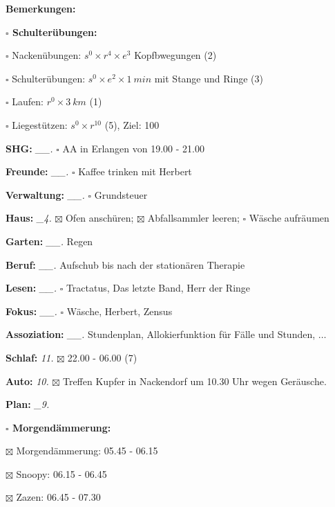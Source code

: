 \documentclass[10pt,a4paper]{article}
\newcommand\prop[1] {{\color {alizarin} {\bf #1}}}        %
\newcommand\opti[1] {{\color {amethyst} {\bf #1}}}        %
\newcommand\mand[1] {{\color {burntorange} {\bf #1}}}     %
\newcommand\topspace{\vskip -15pt \hskip 20pt}
\newcommand\bottomspace{\vskip 4pt}
\newcommand\n[1] { {\sl #1.} \hskip 5pt }
\begin{document}
\begin{mdframed}[style=daystyle]
\begin{labeling}{{\mand {Bemerkungen:}}}
\begin{minipage}{0.75\textwidth}
\begin{labeling}{\prop {$\square$ {Schulterübungen:}}}
        \setlength\itemsep{-3pt}
      \item[$\square$ Nackenübungen:]   $s^0 \times r^4 \times e^3$ Kopfbwegungen (2)
      \item[$\square$ Schulterübungen:] $s^0 \times e^2 \times 1\ min$ mit Stange und Ringe (3)
      \item[$\square$ Laufen:]          $r^0 \times 3\ km$ (1)
      \item[$\square$ Liegestützen:]    $s^0 \times r^{10}$ (5), Ziel: 100
      \end{labeling}
    \end{minipage}
    \bottomspace        
  \item[{\mand {SHG:}}]          \n{\_\_} $\square$ AA in Erlangen von 19.00 - 21.00
  \item[{\mand {Freunde:}}]      \n{\_\_} $\square$ Kaffee trinken mit Herbert
  \item[{\mand {Verwaltung:}}]   \n{\_\_} $\square$ Grundsteuer
  \item[{\mand {Haus:}}]          \n{\_4} $\boxtimes$ Ofen anschüren; $\boxtimes$ Abfallsammler leeren;
        $\square$ Wäsche aufräumen
  \item[{\mand {Garten:}}]       \n{\_\_} Regen
  \item[{\mand {Beruf:}}]        \n{\_\_} Aufschub bis nach der stationären Therapie
  \item[{\mand {Lesen:}}]        \n{\_\_} $\square$ Tractatus, Das letzte Band, Herr der Ringe
  \item[{\mand {Fokus:}}]        \n{\_\_} $\square$ Wäsche, Herbert, Zensus
  \item[{\mand {Assoziation:}}]  \n{\_\_} Stundenplan, Allokierfunktion für Fälle und Stunden, $\ldots$
  \item[{\mand {Schlaf:}}]         \n{11} $\boxtimes$ 22.00 - 06.00 (7)
  \item[{\opti {Auto:}}]           \n{10} $\boxtimes$ Treffen Kupfer in Nackendorf um 10.30 Uhr wegen Geräusche.
  \item[{\mand {Plan:}}]          \n{\_9}
    \topspace
    \begin{minipage}{0.75\textwidth}  
      \begin{labeling}{\prop {$\square$ {Morgendämmerung:}}} 
        \setlength\itemsep{-3pt}
      \item[$\boxtimes$ Morgendämmerung:] 05.45 - 06.15
      \item[$\boxtimes$ Snoopy:]          06.15 - 06.45
      \item[$\boxtimes$ Zazen:]           06.45 - 07.30

\end{labeling}
\end{minipage}
\end{labeling}
\end{mdframed}
\end{document}
